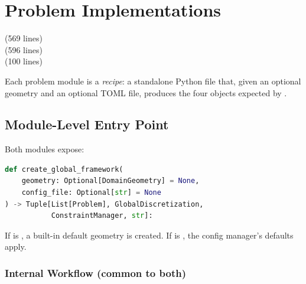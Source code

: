 \section{Problem Implementations}
\label{sec:problems}

\begin{center}
 \quad(569 lines) \\
 \quad(596 lines) \\
 \quad(100 lines)
\end{center}

Each problem module is a \emph{recipe}: a standalone Python file that,
given an optional geometry and an optional TOML file, produces the
four objects expected by .

\subsection{Module-Level Entry Point}

Both modules expose:

\begin{lstlisting}[language=Python, caption={Shared module entry point}]
def create_global_framework(
    geometry: Optional[DomainGeometry] = None,
    config_file: Optional[str] = None
) -> Tuple[List[Problem], GlobalDiscretization,
           ConstraintManager, str]:
\end{lstlisting}

If  is , a built-in default geometry is created.  If
 is , the config manager's defaults apply.

\subsubsection{Internal Workflow (common to both)}

